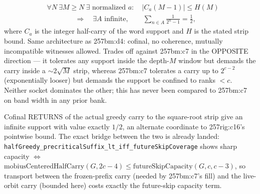 \begin{thm}
\[
\begin{aligned}
&\forall N\ \exists M\ge N\ \exists\text{ normalized }a:\quad
 |C_a(M-1)| \le H(M) \\
&\hspace{4em}\Longrightarrow\quad
 \exists A\text{ infinite},\qquad \sum_{n\in A}\frac1{2^n-1}=\frac12,
\end{aligned}
\]
where $C_a$ is the integer half-carry of the word support and $H$ is the stated strip bound.
Same architecture as 257bm:d4: cofinal, no coherence, mutually incompatible witnesses allowed.
Trades off against 257bm:c7 in the OPPOSITE direction — it tolerates any support inside the
depth-$M$ window but demands the carry inside a $\sim2\sqrt M$ strip, whereas 257bm:c7 tolerates
a carry up to $2^{c-2}$ (exponentially looser) but demands the support be confined to ranks
$<c$. Neither socket dominates the other; this has never been compared to 257bm:c7 on band width
in any prior bank.
\par\noindent{}    
\end{thm}

\begin{thm}
Cofinal RETURNS of the actual greedy carry to the square-root strip give an infinite support
with value exactly $1/2$, an alternate coordinate to 257rig:c16's pointwise bound. The exact
bridge between the two is already landed: \texttt{halfGreedy\_precriticalSuffix\_lt\_iff\_futureSkipCoverage} shows sharp capacity $\Leftrightarrow$
$\mathrm{mobiusCenteredHalfCarry}(G,2c-4) \le \mathrm{futureSkipCapacity}(G,c,c-3)$, so transport
between the frozen-prefix carry (needed by 257bm:c7's fill) and the live-orbit carry (bounded
here) costs exactly the future-skip capacity term.
\par\noindent{}     
\end{thm}


